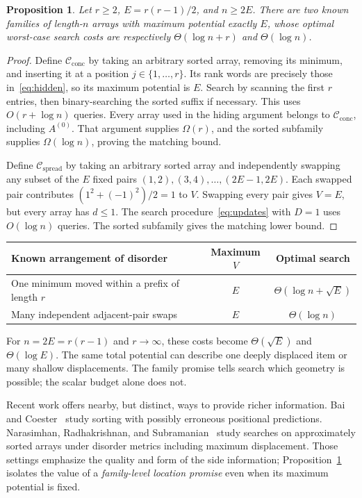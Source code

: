 \documentclass[10pt,letterpaper]{article}
\newtheorem{proposition}[theorem]{Proposition}
\newcommand{\Cconc}{\mathcal C_{\mathrm{conc}}}
\newcommand{\Cspread}{\mathcal C_{\mathrm{spread}}}
\begin{document}
\begin{proposition}\label{prop:location}
Let $r\geq2$, $E=r(r-1)/2$, and $n\geq2E$. There are two known families of
length-$n$ arrays with maximum potential exactly $E$, whose optimal worst-case
search costs are respectively $\Theta(\log n+r)$ and $\Theta(\log n)$.
\end{proposition}
\begin{proof}
Define $\Cconc$ by taking an arbitrary sorted array, removing its minimum, and inserting
it at a position $j\in\{1,\ldots,r\}$. Its rank words are precisely those
in~\eqref{eq:hidden}, so its maximum potential is $E$. Search by scanning the first $r$
entries, then binary-searching the sorted suffix if necessary. This uses
$O(r+\log n)$ queries. Every array used in the hiding argument belongs to $\Cconc$,
including $A^{(0)}$. That argument supplies $\Omega(r)$, and the sorted subfamily
supplies $\Omega(\log n)$, proving the matching bound.

Define $\Cspread$ by taking an arbitrary sorted array and independently swapping any
subset of the $E$ fixed pairs $(1,2),(3,4),\ldots,(2E-1,2E)$. Each swapped pair
contributes $(1^2+(-1)^2)/2=1$ to $V$. Swapping every pair gives $V=E$, but every
array has $d\leq1$. The search procedure~\eqref{eq:updates} with $D=1$ uses
$O(\log n)$ queries. The sorted subfamily gives the matching lower bound.
\end{proof}

\begin{center}
\renewcommand{\arraystretch}{1.18}
\begin{tabular}{@{}p{3.6in}cc@{}}
\toprule
\textbf{Known arrangement of disorder}&\textbf{Maximum $V$}&\textbf{Optimal search}\\
\midrule
One minimum moved within a prefix of length $r$&$E$&$\Theta(\log n+\sqrt E)$\\
Many independent adjacent-pair swaps&$E$&$\Theta(\log n)$\\
\bottomrule
\end{tabular}
\end{center}
For $n=2E=r(r-1)$ and $r\to\infty$, these costs become $\Theta(\sqrt E)$ and
$\Theta(\log E)$. The same total potential can describe one deeply displaced item or
many shallow displacements. The family promise tells search which geometry is possible;
the scalar budget alone does not.

Recent work offers nearby, but distinct, ways to provide richer information.
Bai and Coester~\cite{bai} study sorting with possibly erroneous positional
predictions. Narasimhan, Radhakrishnan, and Subramanian~\cite{narasimhan}
study searches on approximately sorted arrays under disorder metrics including
maximum displacement. Those settings emphasize the quality and form of the
side information; Proposition~\ref{prop:location} isolates the value of a
\emph{family-level location promise} even when its maximum potential is fixed.
\end{document}
